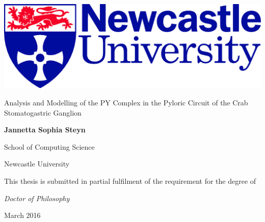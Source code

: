 \documentclass[12pt, a4paper, onecolumn]{book}    %
\begin{document}
	\clearpage\thispagestyle{empty}
	\begin{titlepage}
		\newpage
		\begin{center}
			\includegraphics[scale=0.15]{Newcastle_Master_Col.png}
			\vspace{25mm}
			{\bf\LARGE
				
				\label{Title Page}
				Analysis and Modelling of the PY Complex in the Pyloric Circuit of the Crab Stomatogastric Ganglion 
			}
			
			\vspace{25mm}
			{\Large\bf Jannetta Sophia Steyn}
			
			\large School of Computing Science
			
			\large Newcastle University
			
			\vspace{25mm}
			
			\begin{minipage}[t]{4in}
				\begin{center}
					\large This thesis is submitted in partial fulfilment of the requirement for the degree of
					
					\large\textit{Doctor of Philosophy}
					
					\vspace{5mm}
					
					\Large March 2016                    %
				\end{center}
			\end{minipage}
			
		\end{center}
	\end{titlepage}
	
	
	
	\frontmatter
	\pagestyle{empty}
	
	
	
	
	\pagestyle{plain}
	
	
\end{document}
